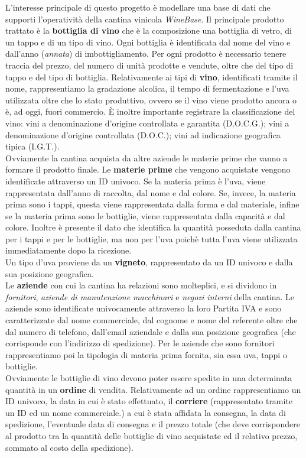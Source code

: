 L'interesse principale di questo progetto è modellare una base di dati che supporti l'operatività della cantina vinicola \emph{WineBase}. Il principale prodotto trattato è la \textbf{bottiglia di vino} che è la composizione una bottiglia di vetro, di un tappo e di un tipo di vino. Ogni bottiglia è identificata dal nome del vino e dall'anno (\emph{annata}) di imbottigliamento. Per ogni prodotto è necessario tenere traccia del prezzo, del numero di unità prodotte e vendute, oltre che del tipo di tappo e del tipo di bottiglia.
Relativamente ai tipi di \textbf{vino}, identificati tramite il nome, rappresentiamo la gradazione alcolica, il tempo di fermentazione e l'uva utilizzata oltre che lo stato produttivo, ovvero se il vino viene prodotto ancora o è, ad oggi, fuori commercio. È inoltre importante registrare la classificazione del vino: vini a denominazione d'origine controllata e garantita (D.O.C.G.); vini a denominazione d'origine controllata (D.O.C.); vini ad indicazione geografica tipica (I.G.T.).\\ Ovviamente la cantina acquista da altre aziende le materie prime che vanno a formare il prodotto finale. Le \textbf{materie prime} che vengono acquistate vengono identificate attraverso un ID univoco. Se la materia prima è l'uva, viene rappresentata dall'anno di raccolta, dal nome e dal colore. Se, invece, la materia prima sono i tappi, questa viene rappresentata dalla forma e dal materiale, infine se la materia prima sono le bottiglie, viene rappresentata dalla capacità e dal colore. Inoltre è presente il dato che identifica la quantità posseduta dalla cantina per i tappi e per le bottiglie, ma non per l'uva poichè tutta l'uva viene utilizzata immediatamente dopo la ricezione.\\
Un tipo d'uva proviene da un \textbf{vigneto}, rappresentato da un ID univoco e dalla sua posizione geografica. \\
Le \textbf{aziende} con cui la cantina ha relazioni sono molteplici, e si dividono in \emph{fornitori}, \emph{aziende di manutenzione macchinari} e \emph{negozi interni} della cantina. Le aziende sono identificate univocamente attraverso la loro Partita IVA e sono caratterizzate dal nome commerciale, dal cognome e nome del referente oltre che dal numero di telefono, dall'email aziendale e dalla sua posizione geografica (che corrisponde con l'indirizzo di spedizione). Per le aziende che sono fornitori rappresentiamo poi la tipologia di materia prima fornita, sia essa uva, tappi o bottiglie.\\
Ovviamente le bottiglie di vino devono poter essere spedite in una determinata quantità in un \textbf{ordine} di vendita. Relativamente ad un ordine rappresentiamo un ID univoco, la data in cui è stato effettuato, il \textbf{corriere} (rappresentato tramite un ID ed un nome commerciale.) a cui è stata affidata la consegna, la data di spedizione, l'eventuale data di consegna e il prezzo totale (che deve corrispondere al prodotto tra la quantità delle bottiglie di vino acquistate ed il relativo prezzo, sommato al costo della spedizione).\\
